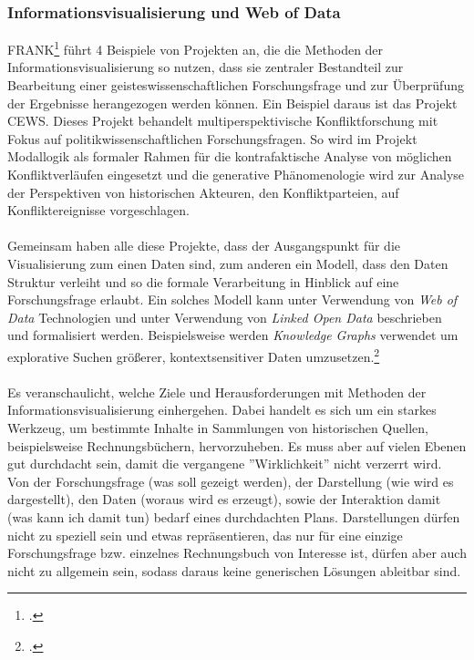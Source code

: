 \documentclass[12pt,a4paper]{article}
\begin{document}
\subsubsection{Informationsvisualisierung und Web of Data}


FRANK\footcite{frank2018visualisierungswerkzeuge} führt 4 Beispiele von Projekten an, die die Methoden der Informationsvisualisierung so nutzen, dass sie zentraler Bestandteil zur Bearbeitung einer geisteswissenschaftlichen Forschungsfrage und zur Überprüfung der Ergebnisse herangezogen werden können. Ein Beispiel daraus ist das Projekt CEWS. Dieses Projekt behandelt multiperspektivische Konfliktforschung mit Fokus auf politikwissenschaftlichen Forschungsfragen. So wird im Projekt Modallogik als formaler Rahmen für die kontrafaktische Analyse von möglichen Konfliktverläufen eingesetzt und die generative Phänomenologie wird zur Analyse der Perspektiven von historischen Akteuren, den Konfliktparteien, auf Konfliktereignisse vorgeschlagen.
\\
\\
Gemeinsam haben alle diese Projekte, dass der Ausgangspunkt für die Visualisierung zum einen Daten sind, zum anderen ein Modell, dass den Daten Struktur verleiht und so die formale Verarbeitung in Hinblick auf eine Forschungsfrage erlaubt. Ein solches Modell kann unter Verwendung von \textit{Web of Data} Technologien und unter Verwendung von \textit{Linked Open Data} beschrieben und formalisiert werden. Beispielsweise werden \textit{Knowledge Graphs} verwendet um explorative Suchen größerer, kontextsensitiver Daten umzusetzen.\footcite{sarrafzadeh2014exploring} 
\\
\\
Es veranschaulicht, welche Ziele und Herausforderungen mit Methoden der Informationsvisualisierung einhergehen. Dabei handelt es sich um ein starkes Werkzeug, um bestimmte Inhalte in Sammlungen von historischen Quellen, beispielsweise Rechnungsbüchern, hervorzuheben. Es muss aber auf vielen Ebenen gut durchdacht sein, damit die vergangene ''Wirklichkeit'' nicht verzerrt wird. Von der Forschungsfrage (was soll gezeigt werden), der Darstellung (wie wird es dargestellt), den Daten (woraus wird es erzeugt), sowie der Interaktion damit (was kann ich damit tun) bedarf eines durchdachten Plans. Darstellungen dürfen nicht zu speziell sein und etwas repräsentieren, das nur für eine einzige Forschungsfrage bzw. einzelnes Rechnungsbuch von Interesse ist, dürfen aber auch nicht zu allgemein sein, sodass daraus keine generischen Lösungen ableitbar sind.
\end{document}
